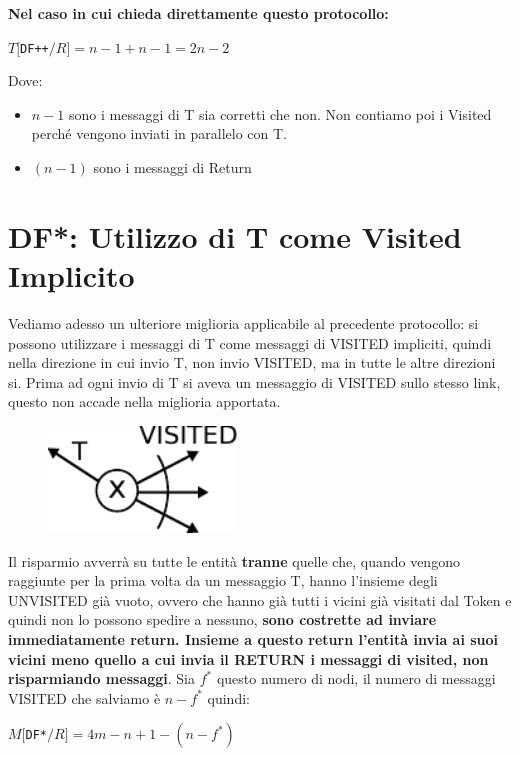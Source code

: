 \textbf{Nel caso in cui chieda direttamente questo protocollo:}
\begin{center}
    $T[$\texttt{DF++}$/R] = n-1 + n-1 = 2n - 2$
\end{center}
Dove:
\begin{itemize}
    \item $n-1$ sono i messaggi di T sia corretti che non. Non contiamo poi i
          Visited perché vengono inviati in parallelo con T.
    \item $(n-1)$ sono i messaggi di Return
\end{itemize}

\section{DF*: Utilizzo di T come Visited Implicito}
Vediamo adesso un ulteriore miglioria applicabile al precedente protocollo: si
possono utilizzare i messaggi di T come messaggi di VISITED impliciti, quindi
nella direzione in cui invio T, non invio VISITED, ma in tutte le altre
direzioni si. Prima ad ogni invio di T si aveva un messaggio di VISITED sullo
stesso link, questo non accade nella miglioria apportata.

\begin{figure}[H]
    \centering
    \includegraphics[width=5cm, keepaspectratio]{capitoli/attraversamento/imgs/n_19}
\end{figure}

Il risparmio avverrà su tutte le entità \textbf{tranne} quelle che, quando
vengono raggiunte per la prima volta da un messaggio T, hanno l'insieme degli
UNVISITED già vuoto, ovvero che hanno già tutti i vicini già visitati dal Token
e quindi non lo possono spedire a nessuno, \textbf{sono costrette ad inviare
    immediatamente return. Insieme a questo return l'entità invia ai suoi vicini
    meno quello a cui invia il RETURN i messaggi di visited, non risparmiando
    messaggi}. Sia $f^*$ questo numero di nodi, il numero di messaggi VISITED che
salviamo è $n-f^*$ quindi:

\begin{center}
    $M[$\texttt{DF*}$/R] = 4m - n + 1 - (n - f^*)$
\end{center}

